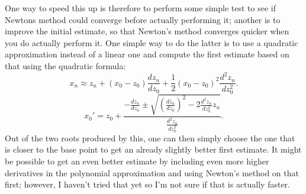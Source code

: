 \documentclass[12pt,a4paper]{article}
\begin{document}
One way to speed this up is therefore to perform some simple test to see if Newtons method could converge before actually performing it; another is to improve the initial estimate, so that Newton's method converges quicker when you do actually perform it. One simple way to do the latter is to use a quadratic approximation instead of a linear one and compute the first estimate based on that using the quadratic formula:
$$x_n \approx z_n+(x_0-z_0)\frac{dz_n}{dz_0}+\frac{1}{2}(x_0-z_0)^2\frac{d^2z_n}{dz_0^2}.$$
$$x_0' = z_0+\frac{-\frac{dz_n}{dz_0}\pm\sqrt{(\frac{dz_n}{dz_0})^2-2\frac{d^2z_n}{dz_0^2}z_n}}{\frac{d^2z_n}{dz_0^2}}.$$
Out of the two roots produced by this, one can then simply choose the one that is closer to the base point to get an already slightly better first estimate. It might be possible to get an even better estimate by including even more higher derivatives in the polynomial approximation and using Newton's method on that first; however, I haven't tried that yet so I'm not sure if that is actually faster.
\end{document}
